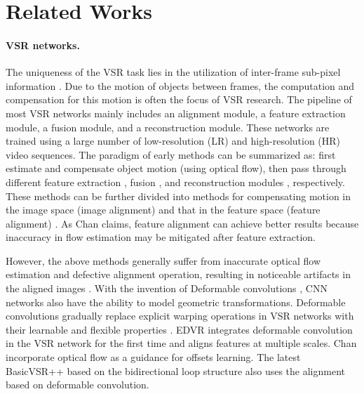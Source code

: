\documentclass{article}
\begin{document}
\vspace{-3mm}
\section{Related Works}
\vspace{-2mm}


\paragraph{VSR networks.}
The uniqueness of the VSR task lies in the utilization of inter-frame sub-pixel information \cite{liu2022video}.
Due to the motion of objects between frames, the computation and compensation for this motion is often the focus of VSR research.
The pipeline of most VSR networks mainly includes an alignment module, a feature extraction module, a fusion module, and a reconstruction module.
These networks are trained using a large number of low-resolution (LR) and high-resolution (HR) video sequences.
The paradigm of early methods \cite{liao2015video,kappeler2016video,liu2017robust,kim2018spatio,xue2019video,kalarot2019multiboot,lin2022flow} can be summarized as: first estimate and compensate object motion (using optical flow), then pass through different feature extraction \cite{sajjadi2018frame,wang2018multi,li2018video}, fusion \cite{tao2017detail,bao2019memc,chan2021basicvsr}, and reconstruction modules \cite{shi2016real}, respectively.  
These methods can be further divided into methods for compensating motion in the image space (image alignment) and that in the feature space (feature alignment) \cite{chan2021basicvsr,wang2019deformable}.
As Chan \etal \cite{chan2021basicvsr} claims, feature alignment can achieve better results because inaccuracy in flow estimation may be mitigated after feature extraction.


However, the above methods generally suffer from inaccurate optical flow estimation and defective alignment operation, resulting in noticeable artifacts in the aligned images \cite{tian2020tdan}.
With the invention of Deformable convolutions \cite{dai2017deformable}, CNN networks also have the ability to model geometric transformations.
Deformable convolutions gradually replace explicit warping operations in VSR networks with their learnable and flexible properties \cite{wang2019edvr,ying2020deformable,tian2020tdan}.
EDVR \cite{wang2019edvr} integrates deformable convolution in the VSR network for the first time and aligns features at multiple scales.
Chan \etal \cite{chan2021understanding} incorporate optical ﬂow as a guidance for offsets learning.
The latest BasicVSR++ \cite{chan2021basicvsr++} based on the bidirectional loop structure also uses the alignment based on deformable convolution.
\end{document}
